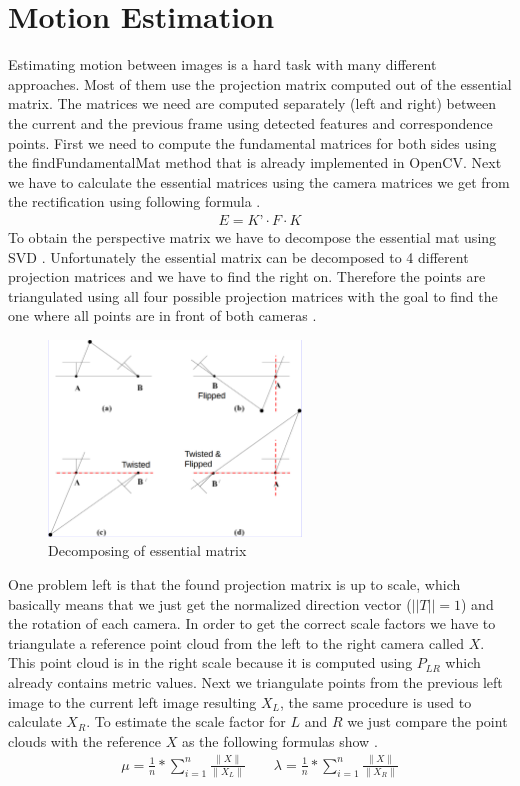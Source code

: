 \documentclass[11pt]{article}
\begin{document}
	\section{Motion Estimation}
	
	Estimating motion between images is a hard task with many different approaches. Most of them use the projection matrix computed out of the essential matrix. The matrices we need are computed separately (left and right) between the current and the previous frame using detected features and correspondence points. First we need to compute the fundamental matrices for both sides using the findFundamentalMat method that is already implemented in OpenCV. Next we have to calculate the essential matrices using the camera matrices we get from the rectification using following formula \cite{HartleyZisserman}.
	\begin{align}
	  E = K’ \cdot F \cdot K
	\end{align}
	To obtain the perspective matrix we have to decompose the essential mat using SVD \cite{SVD_Essential}. Unfortunately the essential matrix can be decomposed to 4 different projection matrices and we have to find the right on. Therefore the points are triangulated using all four possible projection matrices with the goal to find the one where all points are in front of both cameras \cite{ComputerVision}.
	
	\begin{figure}[H]
		\centering
		\includegraphics[width=0.6\textwidth]{images/possible_P_Mats.png}
		\caption{Decomposing of essential matrix \cite{ComputerVision}}
	\end{figure}

	One problem left is that the found projection matrix is up to scale, which basically means that we just get the normalized direction vector ($||T|| = 1$) and the rotation of each camera. In order to get the correct scale factors we have to triangulate a reference point cloud from the left to the right camera called $X$. This point cloud is in the right scale because it is computed using $P_{LR}$ which already contains metric values. Next we triangulate points from the previous left image to the current left image resulting $X_L$, the same procedure is used to calculate $X_R$. To estimate the scale factor for $L$ and $R$ we just compare the point clouds with the reference $X$ as the following formulas show \cite{scaleFactors}.
	\begin{align}
	  \mu = \frac{1}{n} * \sum_{i=1}^{n} \frac{\|X\|}{\|X_L\|} \qquad
	  \lambda = \frac{1}{n} * \sum_{i=1}^{n} \frac{\|X\|}{\|X_R\|}
	\end{align}
\end{document}
